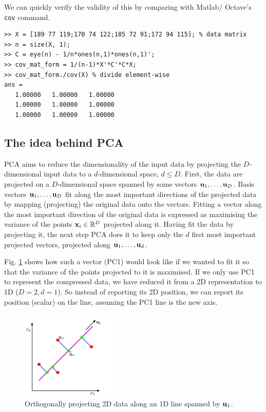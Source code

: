 \documentclass[a4paper]{article}
\begin{document}
We can quickly verify the validity of this by comparing with Matlab/ Octave's \texttt{cov} command.
\begin{verbatim}
>> X = [189 77 119;170 74 122;185 72 91;172 94 115]; % data matrix
>> n = size(X, 1);
>> C = eye(n) - 1/n*ones(n,1)*ones(n,1)';
>> cov_mat_form = 1/(n-1)*X'*C'*C*X;   
>> cov_mat_form./cov(X) % divide element-wise
ans =
   1.00000   1.00000   1.00000
   1.00000   1.00000   1.00000
   1.00000   1.00000   1.00000
\end{verbatim}



\subsection{The idea behind PCA}

PCA aims to reduce the dimensionality of the input data by projecting the $D$-dimensional input data to a $d$-dimensional space, $d\leq D$. First, the data are projected on a $D$-dimensional  space spanned by some vectors $\textbf{u}_1,\ldots,\textbf{u}_D$. Basis vectors $\textbf{u}_1,\ldots,\textbf{u}_D$ fit along the most important directions of the projected data by mapping (projecting) the original data onto the vectors. Fitting a vector along the most important direction of the original data is expressed as maximising the variance of the points $\textbf{x}_i \in \mathbb{R}^D$ projected along it. Having fit the data by projecting it, the next step PCA does it to keep only the $d$ first most important projected vectors, projected along $\textbf{u}_1,\ldots,\textbf{u}_d$.

Fig. \ref{fig:pca_2d_to_1d} shows how such a vector (PC1) would look like if we wanted to fit it so that the variance of the points projected to it is maximised. If we only use PC1 to represent the compressed data, we have reduced it from a 2D representation to 1D ($D=2, d=1$). So instead of reporting its 2D position, we can report its position (scalar) on the line, assuming the PC1 line is the new axis. 
\begin{figure}[H]
    \centering
    \includegraphics[height=4.25cm]{img/project_data_to_1d.PNG}
    \caption{Orthogonally projecting 2D data along an 1D line spanned by $\textbf{u}_1$.}
    \label{fig:pca_2d_to_1d}
\end{figure}
\end{document}
